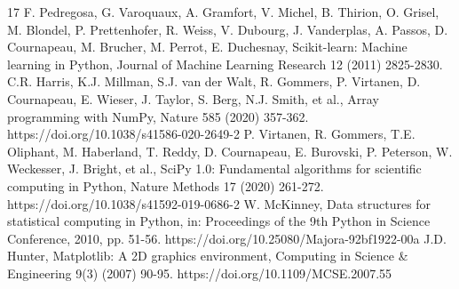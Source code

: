 \documentclass[3p]{elsarticle}
\begin{document}
\begin{thebibliography}{17}
F. Pedregosa, G. Varoquaux, A. Gramfort, V. Michel, B. Thirion, O. Grisel, M. Blondel, P. Prettenhofer, R. Weiss, V. Dubourg, J. Vanderplas, A. Passos, D. Cournapeau, M. Brucher, M. Perrot, E. Duchesnay, Scikit-learn: Machine learning in Python, Journal of Machine Learning Research 12 (2011) 2825-2830.
C.R. Harris, K.J. Millman, S.J. van der Walt, R. Gommers, P. Virtanen, D. Cournapeau, E. Wieser, J. Taylor, S. Berg, N.J. Smith, et al., Array programming with NumPy, Nature 585 (2020) 357-362. https://doi.org/10.1038/s41586-020-2649-2
P. Virtanen, R. Gommers, T.E. Oliphant, M. Haberland, T. Reddy, D. Cournapeau, E. Burovski, P. Peterson, W. Weckesser, J. Bright, et al., SciPy 1.0: Fundamental algorithms for scientific computing in Python, Nature Methods 17 (2020) 261-272. https://doi.org/10.1038/s41592-019-0686-2
W. McKinney, Data structures for statistical computing in Python, in: Proceedings of the 9th Python in Science Conference, 2010, pp. 51-56. https://doi.org/10.25080/Majora-92bf1922-00a
J.D. Hunter, Matplotlib: A 2D graphics environment, Computing in Science \& Engineering 9(3) (2007) 90-95. https://doi.org/10.1109/MCSE.2007.55
\end{thebibliography}
\end{document}
